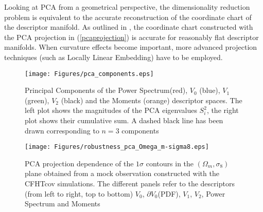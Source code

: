 \documentclass[reprint,aps,prd,superscriptaddress,showkeys,showpacs]{revtex4-1}
\begin{document}
Looking at PCA from a geometrical perspective, the dimensionality reduction problem is equivalent to the accurate reconstruction of the coordinate chart of the descriptor manifold. As outlined in \citep{astroMLText}, the coordinate chart constructed with the PCA projection in (\ref{pcaprojection}) is accurate for reasonably flat descriptor manifolds. When curvature effects become important, more advanced projection techniques (such as Locally Linear Embedding) have to be employed. 



%
\begin{figure*}
\texttt{[image: Figures/pca\_components.eps]}
\caption{Principal Components of the Power Spectrum(red), $V_0$ (blue), $V_1$ (green), $V_2$ (black) and the Moments (orange) descriptor spaces. The left plot shows the magnitudes of the PCA eigenvalues $S_i^2$, the right plot shows their cumulative sum. A dashed black line has been drawn corresponding to $n=3$ components}
\label{pcafig}
\end{figure*}
%
%
\begin{figure*}
\texttt{[image: Figures/robustness\_pca\_Omega\_m-sigma8.eps]}
\caption{PCA projection dependence of the $1\sigma$ contours in the $(\Omega_m,\sigma_8)$ plane obtained from a mock observation constructed with the CFHTcov simulations. The different panels refer to the descriptors (from left to right, top to bottom) $V_0$, $\partial V_0$(PDF), $V_1$, $V_2$, Power Spectrum and Moments}
\label{robustnessfig}
\end{figure*}
%
\end{document}
